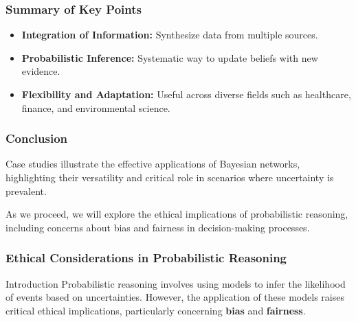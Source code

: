 \documentclass[aspectratio=169]{beamer}
\begin{document}
\begin{frame}[fragile]
    \frametitle{Summary of Key Points}
    \begin{itemize}
        \item \textbf{Integration of Information:} Synthesize data from multiple sources.
        \item \textbf{Probabilistic Inference:} Systematic way to update beliefs with new evidence.
        \item \textbf{Flexibility and Adaptation:} Useful across diverse fields such as healthcare, finance, and environmental science.
    \end{itemize}
\end{frame}

\begin{frame}[fragile]
    \frametitle{Conclusion}
    Case studies illustrate the effective applications of Bayesian networks, highlighting their versatility and critical role in scenarios where uncertainty is prevalent. 

    As we proceed, we will explore the ethical implications of probabilistic reasoning, including concerns about bias and fairness in decision-making processes.
\end{frame}

\begin{frame}[fragile]
    \frametitle{Ethical Considerations in Probabilistic Reasoning}
    \begin{block}{Introduction}
        Probabilistic reasoning involves using models to infer the likelihood of events based on uncertainties. However, the application of these models raises critical ethical implications, particularly concerning \textbf{bias} and \textbf{fairness}.
    \end{block}
\end{frame}
\end{document}
